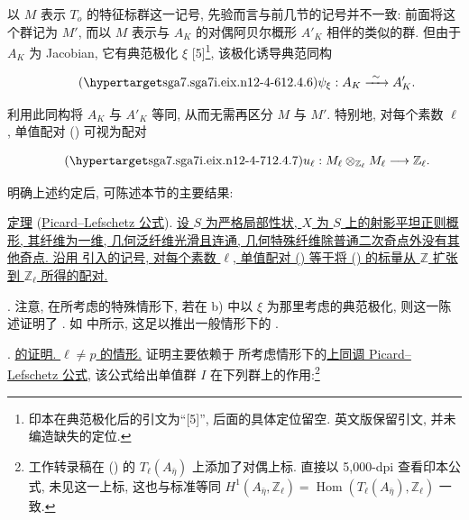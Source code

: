 以 $M$ 表示 $T_o$ 的特征标群这一记号, 先验而言与前几节的记号并不一致: 前面将这个群记为 $M'$, 而以 $M$ 表示与 $A_K$ 的对偶阿贝尔概形 $A'_K$ 相伴的类似的群. 但由于 $A_K$ 为 Jacobian, 它有典范极化 $\xi$ [5]\footnote{印本在典范极化后的引文为“[5]”, 后面的具体定位留空. 英文版保留引文, 并未编造缺失的定位.}, 该极化诱导典范同构

\begin{equation}\tag{\SGARefTarget{sga7.sga7i.eix.n12-4-6}{12.4.6}}
 \psi_\xi:A_K\xrightarrow{\ \sim\ }A'_K.
\end{equation}

\noindent
利用此同构将 $A_K$ 与 $A'_K$ 等同, 从而无需再区分 $M$ 与 $M'$. 特别地, 对每个素数 $\ell$, 单值配对 () 可视为配对

\begin{equation}\tag{\SGARefTarget{sga7.sga7i.eix.n12-4-7}{12.4.7}}
 u_\ell:M_\ell\otimes_{\mathbb Z_\ell}M_\ell
 \longrightarrow\mathbb Z_\ell.
\end{equation}

明确上述约定后, 可陈述本节的主要结果:

\medskip
\noindent
\underline{定理}  (\underline{Picard--Lefschetz 公式}).
\underline{设 $S$ 为严格局部性状, $X$ 为 $S$ 上的射影平坦正则概形, 其纤维为一维, 几何泛纤维光滑且连通, 几何特殊纤维除普通二次奇点外没有其他奇点. 沿用  引入的记号, 对每个素数 $\ell$, 单值配对 () 等于将 () 的标量从 $\mathbb Z$ 扩张到 $\mathbb Z_\ell$ 所得的配对.}


\medskip
\noindent
{}. 注意, 在所考虑的特殊情形下, 若在  b) 中以 $\xi$ 为那里考虑的典范极化, 则这一陈述证明了 . 如  中所示, 这足以推出一般情形下的 .

\medskip
\noindent
{}. \underline{ 的证明. $\ell\ne p$ 的情形.} 证明主要依赖于  所考虑情形下的\underline{上同调 Picard--Lefschetz 公式}, 该公式给出单值群 $I$ 在下列群上的作用:\footnote{工作转录稿在 () 的 $T_\ell(A_{\bar\eta})$ 上添加了对偶上标. 直接以 5,000-dpi 查看印本公式, 未见这一上标, 这也与标准等同 $H^1(A_{\bar\eta},\mathbb Z_\ell)=
\operatorname{Hom}(T_\ell(A_{\bar\eta}),\mathbb Z_\ell)$ 一致.}

